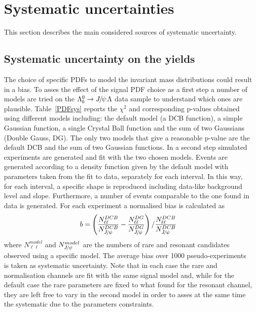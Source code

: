 \section{Systematic uncertainties}
\label{sec:Lb_sys}

This section describes the main considered sources of systematic uncertainty.

\subsection{Systematic uncertainty on the yields}
\label{sec:Lb_yield_sys}

The choice of specific PDFs to model the invariant mass distributions could result
in a bias. To asses the effect of the signal PDF choice as a first step a number of models
are tried on the $\Lb\to\jpsi\Lz$ data sample to understand which ones are plausible.
Table~\ref{PDFsys} reports the $\chi^2$ and corresponding p-values obtained using different
models including: the default model (a DCB function), a simple Gaussian function,
a single Crystal Ball function and the sum of two Gaussians (Double Gauss, DG). The only two models that
give a reasonable p-value are the default DCB and the sum of two Gaussian functions.
In a second step simulated experiments are generated and fit with the two chosen models.
Events are generated according to a density function given by the default model with parameters taken
from the fit to data, separately for each \qsq interval. In this way, for each \qsq interval, a specific
shape is reproduced including data-like background level and slope. Furthermore, a number 
of events comparable to the one found in data is generated. For each experiment a normalised
bias is calculated as
%
\begin{equation}
b = \left(\frac{N^{DCB}_{\ell\ell}}{N^{DCB}_{\jpsi}} - \frac{N^{DG}_{\ell\ell}}{N^{DG}_{\jpsi}}\right) / \frac{N^{DCB}_{\ell\ell}}{N^{DCB}_{\jpsi}}
\end{equation}
%
where $N^{model}_{\ell\ell}$ and $N^{model}_{\jpsi}$ are the numbers of rare and resonant candidates
observed using a specific model. %
The average bias over 1000 pseudo-experiments is taken
as systematic uncertainty. Note that in each case the rare and normalisation channels are fit
with the same signal model and, while for the default case the rare parameters are fixed to what found
for the resonant channel, they are left free to vary in the second model in order to asses
at the same time the systematic due to the parameters constraints.

